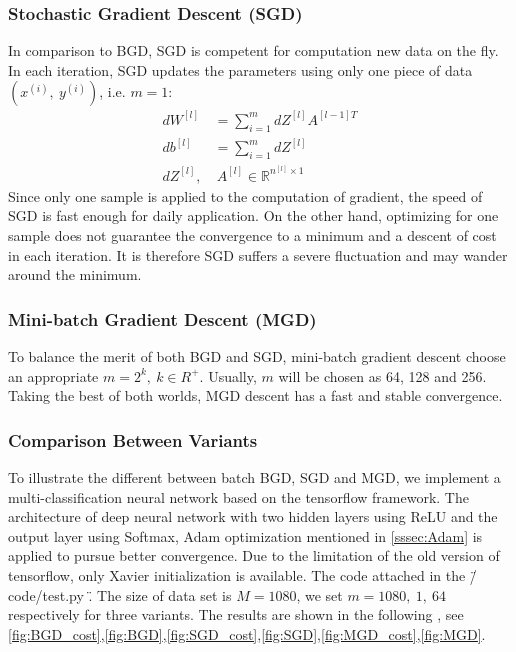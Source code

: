 \subsubsection{Stochastic Gradient Descent (SGD)}
In comparison to BGD, SGD is competent for computation
new data on the fly. In each iteration, SGD updates the parameters using
only one piece of data $ (x^{(i)},\ y^{(i)}) $, i.e. $ m = 1 $:
\begin{equation}
    \begin{split}
        dW^{[l]} & = \sum\limits_{i=1}^mdZ^{[l]}A^{[l-1]T} \\
        db^{[l]} & = \sum\limits_{i=1}^mdZ^{[l]} \\
        dZ^{[l]},&\ A^{[l]} \in \mathbb{R}^{n^{[l]}\times 1}
    \end{split}
\end{equation} 
Since only one sample is applied to the computation of gradient, the speed
of SGD is fast enough for daily application. On the other hand, optimizing
for one sample does not guarantee the convergence to a minimum and a descent
of cost in each iteration. It is therefore SGD suffers a severe fluctuation
and may wander around the minimum.

\subsubsection{Mini-batch Gradient Descent (MGD)}
\label{sssec:MiniBatch}
To balance the merit of both BGD and SGD, mini-batch gradient descent
choose an appropriate $ m = 2^k,\ k\in R^+ $. Usually, $ m $ will be chosen
as 64, 128 and 256. Taking the best of both worlds, MGD
descent has a fast and stable convergence.


\subsubsection{Comparison Between Variants}
To illustrate the different between batch BGD, SGD and MGD, we 
implement a multi-classification neural network based on the tensorflow 
framework. The architecture 
of deep neural network with two hidden layers using ReLU and the output 
layer using Softmax, Adam optimization mentioned in \autoref{sssec:Adam} 
is applied to pursue better convergence. Due to the limitation of the 
old version of tensorflow, only Xavier initialization is available.
The code attached in the \" /code/test.py \".
The size of data set is $ M = 1080 $, we set $ m = 1080,\ 1,\ 
64 $ respectively for three variants. The results are shown in the following
, see \autoref{fig:BGD_cost},\autoref{fig:BGD},\autoref{fig:SGD_cost},\autoref{fig:SGD},\autoref{fig:MGD_cost},\autoref{fig:MGD}.

